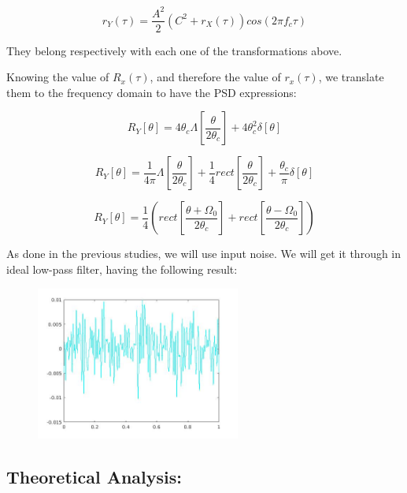 \documentclass[a4paper,11pt]{article}
\begin{document}
\begin{equation}
  r_Y(\tau) = \frac{A^2}{2}(C^2 + r_X(\tau))cos(2\pi f_c \tau)
\end{equation}

They belong respectively with each one of the transformations above.

Knowing the value of $R_x(\tau)$, and therefore the value of $r_x(\tau)$, we translate them to the frequency domain to have the PSD expressions:

\begin{equation}
  R_Y[\theta] = 4\theta_c\Lambda[\frac{\theta}{2\theta_c}]+4\theta_c^2\delta[\theta]
\end{equation}

\begin{equation}
 R_Y[\theta] = \frac{1}{4\pi}\Lambda[\frac{\theta}{2\theta_c}]+\frac{1}{4}rect[\frac{\theta} {2\theta_c}]
+\frac{\theta_c}{\pi}\delta[\theta]
\end{equation}

\begin{equation}
  R_Y[\theta] = \frac{1}{4}(rect[\frac{\theta+\Omega_{0}} {2\theta_c}]+rect[\frac{\theta-\Omega_{0}} {2\theta_c}])
\end{equation}

\newpage

As done in the previous studies, we will use input noise. We will get it through in ideal low-pass filter, having the following result:

\begin{figure}[!hp]
    \begin{center}
    \includegraphics[width=0.6\textwidth]{images/lab3_6.jpg}
    \end{center}
\end{figure}

\newpage

\subsection{Theoretical Analysis:}
\end{document}
